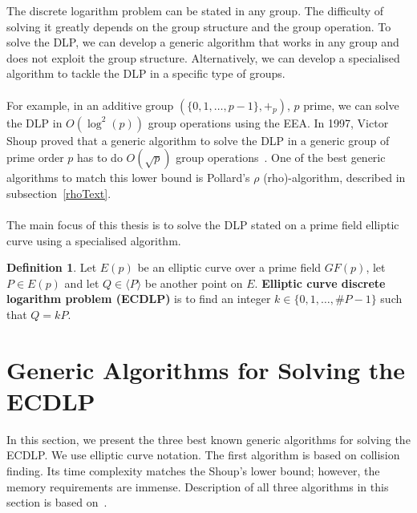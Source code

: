 \documentclass[thesis=M,english]{FITthesis}[2012/10/20]
\theoremstyle{remark}
\theoremstyle{definition}
\newtheorem{DF}{Definition}[section]
\begin{document}
\noindent The discrete logarithm problem can be stated in any group. The difficulty of solving it greatly depends on the group structure and the group operation. To solve the DLP, we can develop a generic algorithm that works in any group and does not exploit the group structure. Alternatively, we can develop a specialised algorithm to tackle the DLP in a specific type of groups. \\\\
\noindent For example, in an additive group $(\{0,1,\ldots, p-1\}, +_p)$, $p$ prime, we can solve the DLP in $O(\log^2(p))$ group operations using the EEA. In 1997, Victor Shoup proved that a generic algorithm to solve the DLP in a generic group of prime order $p$ has to do $O(\sqrt{p})$ group operations~\cite{shoup}. One of the best generic algorithms to match this lower bound is Pollard's $\rho$ (rho)-algorithm, described in subsection~\ref{rhoText}. 
\\
\\
\noindent The main focus of this thesis is to solve the DLP stated on a prime field elliptic curve using a specialised algorithm. 
\begin{DF}
Let $E(p)$ be an elliptic curve over a prime field $GF(p)$, let $P \in E(p)$ and let $Q \in \langle P \rangle$ be another point on $E$. \textbf{Elliptic curve discrete logarithm problem (ECDLP)} is to find an integer $k \in \{0,1,\ldots, \#P - 1\}$ such that $Q = kP$.
\end{DF}
\section{Generic Algorithms for Solving the ECDLP}
In this section, we present the three best known generic algorithms for solving the ECDLP. We use elliptic curve notation. The first algorithm is based on collision finding. Its time complexity matches the Shoup's lower bound; however, the memory requirements are immense. Description of all three algorithms in this section is based on~\cite{mky}.
\end{document}
